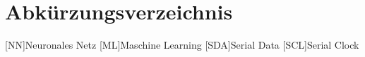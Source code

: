 \section*{Abkürzungsverzeichnis}
\begin{acronym}
[NN]{Neuronales Netz}
[ML]{Maschine Learning}
[SDA]{Serial Data}
[SCL]{Serial Clock}




\end{acronym}